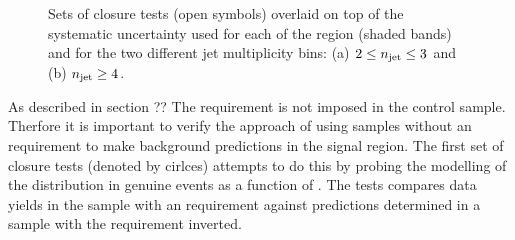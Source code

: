 \begin{figure}[h!]
  \begin{center}
     \\
     \\
    \caption{Sets of closure tests (open symbols) overlaid on top of
      the systematic uncertainty used for each of the \scalht
      region (shaded bands) and for the two different jet
      multiplicity bins: (a) $2 \leq n_{\text{jet}} \leq 3$ and (b) $n_{\text{jet}} \geq
      4$.  }
    \label{fig:closure}
  \end{center} 
\end{figure}

As described in section ?? The \alphat requirement is not imposed 
in the \mj control sample. Therfore it is important to verify the 
approach of using \mj samples without an \alphat requirement to 
make background predictions in the signal region.  The first set of
closure tests (denoted by cirlces) attempts to do this by probing
the modelling of the \alphat distribution in genuine \met events as a
function of \scalht.  The tests compares data yields in the \mj
sample with an \alphat requirement against predictions determined in a
\mj sample with the \alphat requirement inverted. 

